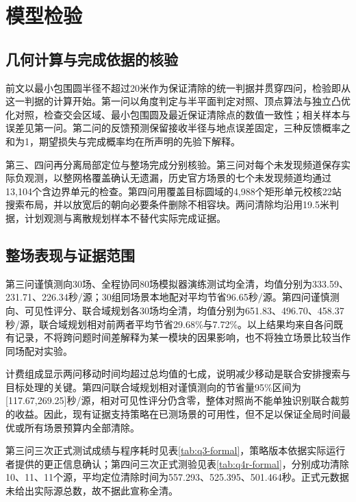 \documentclass[UTF8,a4paper,zihao=-4,fontset=none]{ctexart}
\begin{document}
\FloatBarrier





\section{模型检验}

\subsection{几何计算与完成依据的核验}

前文以最小包围圆半径不超过20米作为保证清除的统一判据并贯穿四问，检验即从这一判据的计算开始。第一问以角度判定与半平面判定对照、顶点算法与独立凸优化对照，检查交会区域、最小包围圆及最近保证清除点的数值一致性；相关样本与误差见第一问。第二问的反馈预测保留接收半径与地点误差固定，三种反馈概率之和为1，期望损失与完成概率均在所声明的先验下解释。

第三、四问再分离局部定位与整场完成分别核验。第三问对每个未发现频道保存实际负观测，以整网格覆盖确认无遗漏，历史官方场景的七个未发现频道均通过13,104个含边界单元的检查。第四问用覆盖目标圆域的4,988个矩形单元校核22站搜索布局，并以放宽后的朝向必要条件删除不相容块。两问清除均沿用19.5米判据，计划观测与离散规划样本不替代实际完成证据。

\subsection{整场表现与证据范围}

第三问谨慎测向30场、全程协同80场模拟器演练测试均全清，均值分别为333.59、231.71、226.34秒/源；30组同场景本地配对平均节省96.65秒/源。第四问谨慎测向、可见性评分、联合域规划各30场均全清，均值分别为651.83、496.70、458.37秒/源，联合域规划相对前两者平均节省29.68\%与7.72\%。以上结果均来自各问既有记录，不将跨问题时间差解释为某一模块的因果影响，也不将独立场景比较当作同场配对实验。

计费组成显示两问移动时间均超过总均值的七成，说明减少移动是联合安排搜索与目标处理的关键。第四问联合域规划相对谨慎测向的节省量95\%区间为[117.67,269.25]秒/源，相对可见性评分仍含零，整体对照尚不能单独识别联合裁剪的收益。因此，现有证据支持策略在已测场景的可用性，但不足以保证全局时间最优或所有场景预算内全部清除。

第三问三次正式测试成绩与程序耗时见表\ref{tab:q3-formal}，策略版本依据实际运行者提供的更正信息确认；第四问三次正式测验见表\ref{tab:q4r-formal}，分别成功清除10、11、11个源，平均定位清除时间为557.293、525.395、501.464秒。正式元数据未给出实际源总数，故不据此宣称全清。
\end{document}
